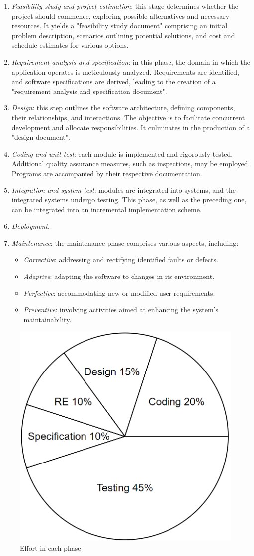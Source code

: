 \begin{enumerate}
    \item \textit{Feasibility study and project estimation}: this stage determines whether the project should commence, exploring possible alternatives and necessary resources. 
        It yields a "feasibility study document" comprising an initial problem description, scenarios outlining potential solutions, and cost and schedule estimates for various options.
    \item \textit{Requirement analysis and specification}: in this phase, the domain in which the application operates is meticulously analyzed. 
        Requirements are identified, and software specifications are derived, leading to the creation of a "requirement analysis and specification document". 
    \item \textit{Design}: this step outlines the software architecture, defining components, their relationships, and interactions. 
        The objective is to facilitate concurrent development and allocate responsibilities. 
        It culminates in the production of a "design document". 
    \item \textit{Coding and unit test}: each module is implemented and rigorously tested. 
        Additional quality assurance measures, such as inspections, may be employed. 
        Programs are accompanied by their respective documentation.
    \item \textit{Integration and system test}: modules are integrated into systems, and the integrated systems undergo testing. 
        This phase, as well as the preceding one, can be integrated into an incremental implementation scheme.
    \item \textit{Deployment}.
    \item \textit{Maintenance}: the maintenance phase comprises various aspects, including:
        \begin{itemize}
            \item \textit{Corrective}: addressing and rectifying identified faults or defects.
            \item \textit{Adaptive}: adapting the software to changes in its environment.
            \item \textit{Perfective}: accommodating new or modified user requirements.
            \item \textit{Preventive}: involving activities aimed at enhancing the system's maintainability.
        \end{itemize}
\end{enumerate}
\begin{figure}[H]
    \centering
    \includegraphics[width=0.35\linewidth]{images/effort.png}
    \caption{Effort in each phase}
\end{figure}

